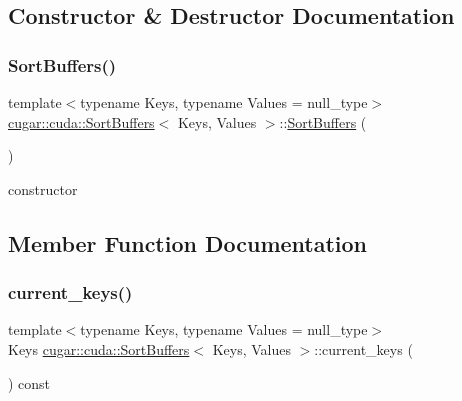 \subsection{Constructor \& Destructor Documentation}
\mbox{\label{structcugar_1_1cuda_1_1_sort_buffers_a46b0e31a68ddb78edc546fbebb1e7744}} 
\subsubsection{\texorpdfstring{Sort\+Buffers()}{SortBuffers()}}
{\footnotesize\ttfamily template$<$typename Keys, typename Values = null\+\_\+type$>$ \\
\hyperlink{structcugar_1_1cuda_1_1_sort_buffers}{cugar\+::cuda\+::\+Sort\+Buffers}$<$ Keys, Values $>$\+::\hyperlink{structcugar_1_1cuda_1_1_sort_buffers}{Sort\+Buffers} (\begin{DoxyParamCaption}{ }\end{DoxyParamCaption})\hspace{0.3cm}{\ttfamily [inline]}}

constructor 

\subsection{Member Function Documentation}
\mbox{\label{structcugar_1_1cuda_1_1_sort_buffers_a91c33249e9f810ec895a62462c562722}} 
\subsubsection{\texorpdfstring{current\+\_\+keys()}{current\_keys()}}
{\footnotesize\ttfamily template$<$typename Keys, typename Values = null\+\_\+type$>$ \\
Keys \hyperlink{structcugar_1_1cuda_1_1_sort_buffers}{cugar\+::cuda\+::\+Sort\+Buffers}$<$ Keys, Values $>$\+::current\+\_\+keys (\begin{DoxyParamCaption}{ }\end{DoxyParamCaption}) const\hspace{0.3cm}{\ttfamily [inline]}}

